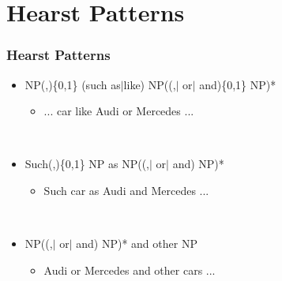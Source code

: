 \section{Hearst Patterns}
\label{sec:hearst-patterns}

\begin{frame}
  \frametitle{Hearst Patterns}

  \begin{itemize}
  \item NP(,)\{0,1\} (such as$\vert$like)
    NP((,$\vert$ or$\vert$ and)\{0,1\} NP)*
    \begin{itemize}
    \item ... car like Audi or Mercedes ...
    \end{itemize}~\\

  \item Such(,)\{0,1\} NP as NP((,$\vert$ or$\vert$ and) NP)*
    \begin{itemize}
    \item Such car as Audi and Mercedes ...
    \end{itemize}~\\

  \item NP((,$\vert$ or$\vert$ and) NP)* and  other NP
    \begin{itemize}
    \item Audi or Mercedes and other cars ...
    \end{itemize}

  \end{itemize}
\end{frame}
